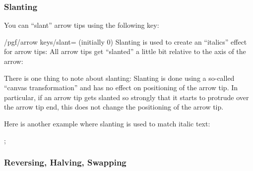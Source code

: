 \subsubsection{Slanting}

You can ``slant'' arrow tips using the following key:

\begin{key}{/pgf/arrow keys/slant= (initially 0)}
    Slanting is used to create an ``italics'' effect for arrow tips: All arrow
    tips get ``slanted'' a little bit relative to the axis of the arrow:
\begin{codeexample}[preamble={\usetikzlibrary{arrows.meta}}]
\end{codeexample}
    There is one thing to note about slanting: Slanting is done using a
    so-called ``canvas transformation'' and has no effect on positioning of
    the arrow tip. In particular, if an arrow tip gets slanted so strongly that
    it starts to protrude over the arrow tip end, this does not change the
    positioning of the arrow tip.

    Here is another example where slanting is used to match italic text:
\begin{codeexample}[preamble={\usetikzlibrary{arrows.meta,graphs}}]
\tikz [>={[slant=.3] To[] To[]}]
  ;
\end{codeexample}
\end{key}


\subsubsection{Reversing, Halving, Swapping}
\label{section-arrow-key-harpoon}

